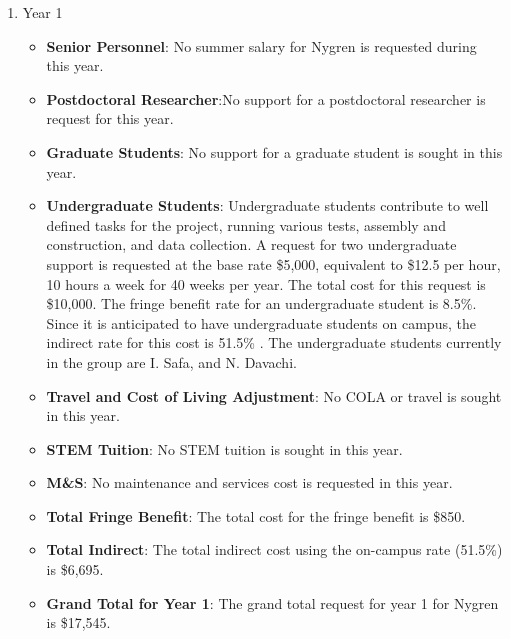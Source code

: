 \begin{enumerate}
\begin{itemize}
\end{itemize}



\item{Year 1}
\begin{itemize}[noitemsep,nolistsep]
\item{{\bf Senior Personnel}: No summer salary for Nygren is requested during this year.}

\item {{\bf Postdoctoral Researcher}:No support for a postdoctoral researcher is request for this year.} 

\item{{\bf Graduate Students}: No support for a graduate student is sought in this year.}

\item {{\bf Undergraduate Students}: Undergraduate students contribute to well defined tasks for the project, running various tests, assembly and construction, and data collection.  A request for two undergraduate support is requested at the base rate \$5,000, equivalent to \$12.5 per hour, 10 hours a week for 40 weeks per year.  The total cost for this request is \$10,000.  The fringe benefit rate for an undergraduate student is 8.5\%.  Since it is anticipated to have undergraduate students on campus, the indirect rate for this cost is 51.5\% .  The undergraduate students currently in the group are I. Safa, and N. Davachi.}

\item{{\bf Travel and Cost of Living Adjustment}: No COLA or travel is sought in this year.}

\item {{\bf STEM Tuition}: No STEM tuition is sought in this year.}

\item {{\bf M\&S}: No maintenance and services cost is requested in this year.}

\item {{\bf Total Fringe Benefit}: The total cost for the fringe benefit is \$850.}

\item {{\bf Total Indirect}: The total indirect cost using the on-campus rate (51.5\%) is \$6,695.}

\item {{\bf Grand Total for Year 1}: The grand total request for year 1 for Nygren is \$17,545.}

\end{itemize}


\end{enumerate}
